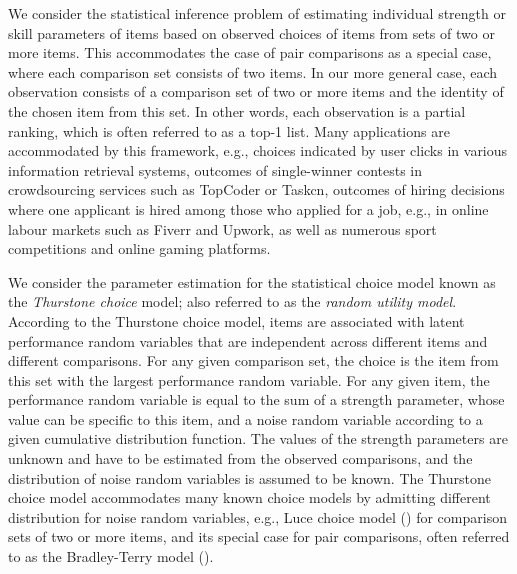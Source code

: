 We consider the statistical inference problem of estimating individual strength or skill parameters of items based on observed choices of items from sets of two or more items. This accommodates the case of pair comparisons as a special case, where each comparison set consists of two items. In our more general case, each observation consists of a comparison set of two or more items and the identity of the chosen item from this set. In other words, each observation is a partial ranking, which is often referred to as a top-1 list. Many applications are accommodated by this framework, e.g., choices indicated by user clicks in various information retrieval systems, outcomes of single-winner contests in crowdsourcing services such as TopCoder or Taskcn, outcomes of hiring decisions where one applicant is hired among those who applied for a job, e.g., in online labour markets such as Fiverr and Upwork, as well as numerous sport competitions and online gaming platforms. 

We consider the parameter estimation for the statistical choice model known as the \emph{Thurstone choice} model; also referred to as the \emph{random utility model}. According to the Thurstone choice model, items are associated with latent performance random variables that are independent across different items and different comparisons. For any given comparison set, the choice is the item from this set with the largest performance random variable. For any given item, the performance random variable is equal to the sum of a strength parameter, whose value can be specific to this item, and a noise random variable according to a given cumulative distribution function. The values of the strength parameters are unknown and have to be estimated from the observed comparisons, and the distribution of noise random variables is assumed to be known. The Thurstone choice model accommodates many known choice models by admitting different distribution for noise random variables, e.g., Luce choice model (\cite{L59}) for comparison sets of two or more items, and its special case for pair comparisons, often referred to as the Bradley-Terry model (\cite{BT54}). 

